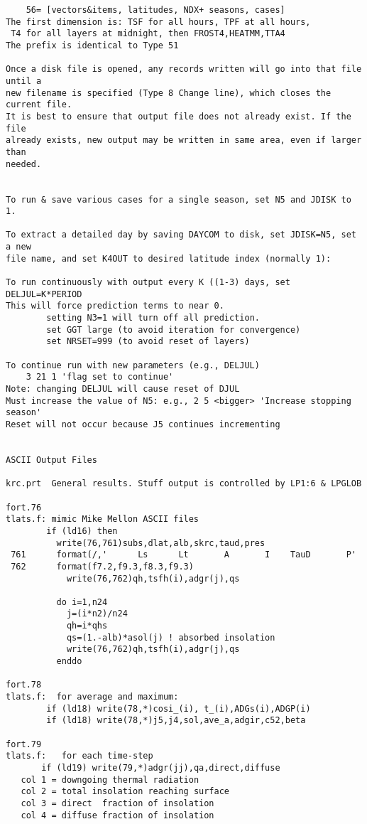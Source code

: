 \begin{verbatim}
    56= [vectors&items, latitudes, NDX+ seasons, cases]
The first dimension is: TSF for all hours, TPF at all hours, 
 T4 for all layers at midnight, then FROST4,HEATMM,TTA4
The prefix is identical to Type 51

Once a disk file is opened, any records written will go into that file until a
new filename is specified (Type 8 Change line), which closes the current file.
It is best to ensure that output file does not already exist. If the file
already exists, new output may be written in same area, even if larger than
needed.

   
To run & save various cases for a single season, set N5 and JDISK to 1.

To extract a detailed day by saving DAYCOM to disk, set JDISK=N5, set a new
file name, and set K4OUT to desired latitude index (normally 1):

To run continuously with output every K ((1-3) days, set DELJUL=K*PERIOD
This will force prediction terms to near 0.
        setting N3=1 will turn off all prediction.
        set GGT large (to avoid iteration for convergence)
        set NRSET=999 (to avoid reset of layers)

To continue run with new parameters (e.g., DELJUL)
	3 21 1 'flag set to continue'
Note: changing DELJUL will cause reset of DJUL
Must increase the value of N5: e.g., 2 5 <bigger> 'Increase stopping season' 
Reset will not occur because J5 continues incrementing


ASCII Output Files

krc.prt  General results. Stuff output is controlled by LP1:6 & LPGLOB

fort.76
tlats.f: mimic Mike Mellon ASCII files
        if (ld16) then
          write(76,761)subs,dlat,alb,skrc,taud,pres
 761      format(/,'      Ls      Lt       A       I    TauD       P'
 762      format(f7.2,f9.3,f8.3,f9.3)
            write(76,762)qh,tsfh(i),adgr(j),qs

          do i=1,n24
            j=(i*n2)/n24
            qh=i*qhs
            qs=(1.-alb)*asol(j) ! absorbed insolation
            write(76,762)qh,tsfh(i),adgr(j),qs
          enddo

fort.78
tlats.f:  for average and maximum:
        if (ld18) write(78,*)cosi_(i), t_(i),ADGs(i),ADGP(i)
        if (ld18) write(78,*)j5,j4,sol,ave_a,adgir,c52,beta

fort.79
tlats.f:   for each time-step
       if (ld19) write(79,*)adgr(jj),qa,direct,diffuse
   col 1 = downgoing thermal radiation
   col 2 = total insolation reaching surface
   col 3 = direct  fraction of insolation
   col 4 = diffuse fraction of insolation


\end{verbatim}
